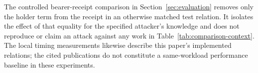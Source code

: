 The controlled bearer-receipt comparison in Section~\ref{sec:evaluation} removes only the holder term from the receipt in an otherwise matched test relation. It isolates the effect of that equality for the specified attacker's knowledge and does not reproduce or claim an attack against any work in Table~\ref{tab:comparison-context}. The local timing measurements likewise describe this paper's implemented relations; the cited publications do not constitute a same-workload performance baseline in these experiments.
